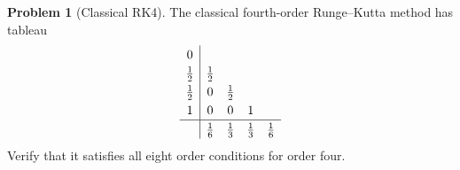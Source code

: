 \documentclass[11pt]{article}
\theoremstyle{definition}
\newtheorem{problem}{Problem}
\begin{document}
\begin{problem}[Classical RK4]\label{prob:rk4}
The classical fourth-order Runge--Kutta method has tableau
\[
  \renewcommand{\arraystretch}{1.25}
  \begin{array}{c|cccc}
    0        &          &          &   & \\
    \tfrac12 & \tfrac12 &          &   & \\
    \tfrac12 & 0        & \tfrac12 &   & \\
    1        & 0        & 0        & 1 & \\ \hline
             & \tfrac16 & \tfrac13 & \tfrac13 & \tfrac16
  \end{array}
\]
Verify that it satisfies all eight order conditions for order four.
\end{problem}
\end{document}
